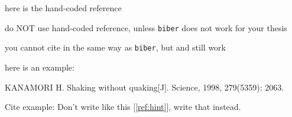\chapter*{\bibname}

\begin{manref}
\item \label{ref:hint} here is the hand-coded reference
\item do NOT use hand-coded reference, unless \texttt{biber} does not work for your thesis
\item you cannot cite in the same way as \texttt{biber}, but  and  still work
\item here is an example:
\item \label{ref:man} KANAMORI H. Shaking without quaking[J]. Science, 1998, 279(5359): 2063.
\end{manref}

Cite example:
Don't write like this [\ref{ref:hint}],
write that instead.
